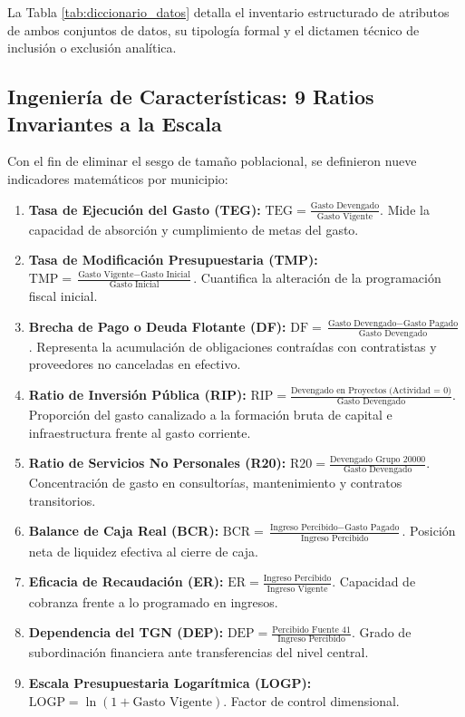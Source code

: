 \documentclass[11pt,a4paper]{article}
\begin{document}
La Tabla \ref{tab:diccionario_datos} detalla el inventario estructurado de atributos de ambos conjuntos de datos, su tipología formal y el dictamen técnico de inclusión o exclusión analítica.



\subsection{Ingeniería de Características: 9 Ratios Invariantes a la Escala}
Con el fin de eliminar el sesgo de tamaño poblacional, se definieron nueve indicadores matemáticos por municipio:
\begin{enumerate}[label=\textbf{\arabic*.}]
    \item \textbf{Tasa de Ejecución del Gasto (TEG):} $\text{TEG} = \frac{\text{Gasto Devengado}}{\text{Gasto Vigente}}$. Mide la capacidad de absorción y cumplimiento de metas del gasto.
    \item \textbf{Tasa de Modificación Presupuestaria (TMP):} $\text{TMP} = \frac{\text{Gasto Vigente} - \text{Gasto Inicial}}{\text{Gasto Inicial}}$. Cuantifica la alteración de la programación fiscal inicial.
    \item \textbf{Brecha de Pago o Deuda Flotante (DF):} $\text{DF} = \frac{\text{Gasto Devengado} - \text{Gasto Pagado}}{\text{Gasto Devengado}}$. Representa la acumulación de obligaciones contraídas con contratistas y proveedores no canceladas en efectivo.
    \item \textbf{Ratio de Inversión Pública (RIP):} $\text{RIP} = \frac{\text{Devengado en Proyectos (Actividad = 0)}}{\text{Gasto Devengado}}$. Proporción del gasto canalizado a la formación bruta de capital e infraestructura frente al gasto corriente.
    \item \textbf{Ratio de Servicios No Personales (R20):} $\text{R20} = \frac{\text{Devengado Grupo 20000}}{\text{Gasto Devengado}}$. Concentración de gasto en consultorías, mantenimiento y contratos transitorios.
    \item \textbf{Balance de Caja Real (BCR):} $\text{BCR} = \frac{\text{Ingreso Percibido} - \text{Gasto Pagado}}{\text{Ingreso Percibido}}$. Posición neta de liquidez efectiva al cierre de caja.
    \item \textbf{Eficacia de Recaudación (ER):} $\text{ER} = \frac{\text{Ingreso Percibido}}{\text{Ingreso Vigente}}$. Capacidad de cobranza frente a lo programado en ingresos.
    \item \textbf{Dependencia del TGN (DEP):} $\text{DEP} = \frac{\text{Percibido Fuente 41}}{\text{Ingreso Percibido}}$. Grado de subordinación financiera ante transferencias del nivel central.
    \item \textbf{Escala Presupuestaria Logarítmica (LOGP):} $\text{LOGP} = \ln(1 + \text{Gasto Vigente})$. Factor de control dimensional.
\end{enumerate}
\end{document}
